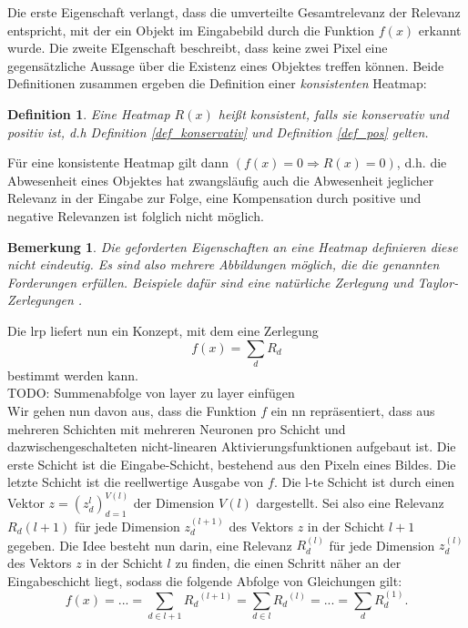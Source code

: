 \documentclass[11pt,a4paper]{article}
\def\emph#1{\textit{#1}}
\newtheorem{definition}[theorem]{Definition}
\newtheorem{remark}[theorem]{Bemerkung}
\numberwithin{equation}{section}
\begin{document}
	Die erste Eigenschaft verlangt, dass die umverteilte Gesamtrelevanz der Relevanz entspricht, mit der ein Objekt im Eingabebild durch die Funktion $f(x)$ erkannt wurde.
	Die zweite EIgenschaft beschreibt, dass keine zwei Pixel eine gegensätzliche Aussage über die Existenz eines Objektes treffen können. Beide Definitionen zusammen ergeben die Definition einer \textit{konsistenten} Heatmap:
	
	\begin{definition}
		Eine Heatmap $R(x)$ heißt \emph{konsistent}, falls sie konservativ und positiv ist, d.h Definition \ref{def_konservativ} und Definition \ref{def_pos} gelten.
	\end{definition}
	
	Für eine konsistente Heatmap gilt dann $(f(x) = 0 \Rightarrow R(x) = 0)$, d.h. die Abwesenheit eines Objektes hat zwangsläufig auch die Abwesenheit jeglicher Relevanz in der Eingabe zur Folge, eine Kompensation durch positive und negative Relevanzen ist folglich nicht möglich.
	
	\begin{remark}
		Die geforderten Eigenschaften an eine Heatmap definieren diese nicht eindeutig. Es sind also mehrere Abbildungen möglich, die die genannten Forderungen erfüllen. Beispiele dafür sind eine natürliche Zerlegung und Taylor-Zerlegungen \cite{dtd_paper}.
	\end{remark}
	
	Die \gls{lrp} liefert nun ein Konzept, mit dem eine Zerlegung 
	\begin{equation}
	f(x) = \sum_dR_d
	\end{equation}
	bestimmt werden kann.\\
	TODO: Summenabfolge von layer zu layer einfügen\\
	
	
	Wir gehen nun davon aus, dass die Funktion $f$ ein \gls{nn} repräsentiert, dass aus mehreren Schichten mit mehreren Neuronen pro Schicht und dazwischengeschalteten nicht-linearen Aktivierungsfunktionen aufgebaut ist.
	Die erste Schicht ist die Eingabe-Schicht, bestehend aus den Pixeln eines Bildes. Die letzte Schicht ist die reellwertige Ausgabe von $f$. Die l-te Schicht ist durch einen Vektor $z = (z_d^{l})_{d=1}^{V(l)}$ der Dimension $V(l)$ dargestellt. Sei also eine Relevanz $R_d{(l+1)}$ für jede Dimension $z_d^{(l+1)}$ des Vektors $z$ in der Schicht $l+1$ gegeben. Die Idee besteht nun darin, eine Relevanz $R_d^{(l)}$ für jede Dimension $z_d^{(l)}$ des Vektors $z$ in der Schicht $l$ zu finden, die einen Schritt näher an der Eingabeschicht liegt, sodass die folgende Abfolge von Gleichungen gilt:
	\begin{equation}
	f(x) = ... = \sum_{d\in l+1}{R_d}^{(l+1)} = \sum_{d\in l}{R_d}^{(l)} = ... = \sum_d{R_d^{(1)}}.\label{erhaltungseigenschaft}
	\end{equation}
	
\end{document}
